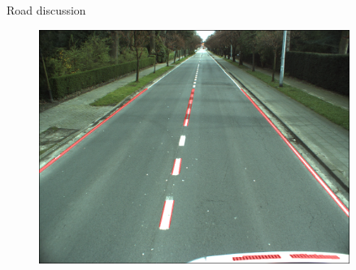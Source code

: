 \documentclass[12pt]{beamer}
\begin{document}
\begin{frame}{Road discussion}
    \begin{figure}
        \includegraphics[width=0.9\textwidth]{resources/png/roadgood.png}
    \end{figure}
\end{frame}
\end{document}
